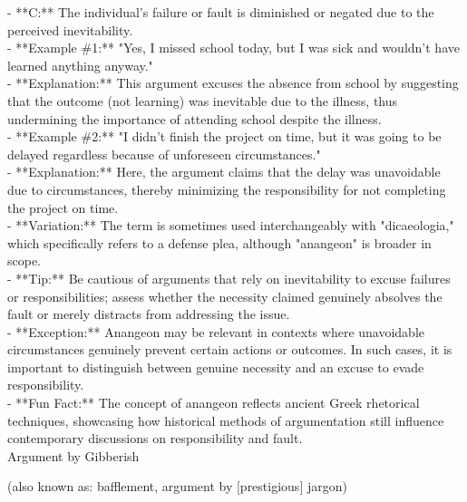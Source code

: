 \documentclass[a4paper,12pt,single,pdftex]{scrbook}
\begin{document}
    
        - **C:** The individual’s failure or fault is diminished or negated due to the perceived inevitability.
    \\

    
      - **Example \#1:** "Yes, I missed school today, but I was sick and wouldn't have learned anything anyway."
    \\

    
      - **Explanation:** This argument excuses the absence from school by suggesting that the outcome (not learning) was inevitable due to the illness, thus undermining the importance of attending school despite the illness.
    \\

    
      - **Example \#2:** "I didn’t finish the project on time, but it was going to be delayed regardless because of unforeseen circumstances."
    \\

    
      - **Explanation:** Here, the argument claims that the delay was unavoidable due to circumstances, thereby minimizing the responsibility for not completing the project on time.
    \\

    
      - **Variation:** The term is sometimes used interchangeably with "dicaeologia," which specifically refers to a defense plea, although "anangeon" is broader in scope.
    \\

    
      - **Tip:** Be cautious of arguments that rely on inevitability to excuse failures or responsibilities; assess whether the necessity claimed genuinely absolves the fault or merely distracts from addressing the issue.
    \\

    
      - **Exception:** Anangeon may be relevant in contexts where unavoidable circumstances genuinely prevent certain actions or outcomes. In such cases, it is important to distinguish between genuine necessity and an excuse to evade responsibility.
    \\

    
      - **Fun Fact:** The concept of anangeon reflects ancient Greek rhetorical techniques, showcasing how historical methods of argumentation still influence contemporary discussions on responsibility and fault.
    \\

  

Argument by Gibberish
    
      (also known as: bafflement, argument by [prestigious] jargon)
    \\
\end{document}
